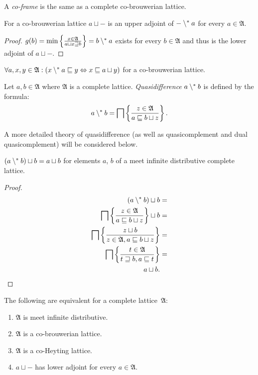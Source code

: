 \begin{defn}
A \emph{co-frame} is the same as a complete co-brouwerian lattice.\end{defn}
\begin{thm}
\label{cobrow-adj}For a co-brouwerian lattice $a\sqcup\mathord-$
is an upper adjoint of $\mathord-\setminus^{\ast} a$ for every $a\in\mathfrak{A}$.\end{thm}
\begin{proof}
$g(b)=\min\left\{ \frac{x\in\mathfrak{A}}{a\sqcup x\sqsupseteq b}\right\}=b\setminus^{\ast} a$
exists for every $b\in\mathfrak{A}$ and thus is the lower adjoint
of $a\sqcup\mathord-$.\end{proof}
\begin{cor}
\label{adjoint-brow-full}$\forall a,x,y\in\mathfrak{A}:(x\setminus^{\ast} a\sqsubseteq y\Leftrightarrow x\sqsubseteq a\sqcup y)$
for a co-brouwerian lattice.\end{cor}
\begin{defn}
Let $a,b\in\mathfrak{A}$ where $\mathfrak{A}$
is a complete lattice. \emph{Quasidifference} $a\setminus^{\ast} b$ is
defined by the formula:
\[
a\setminus^{\ast} b=\bigsqcap\left\{ \frac{z\in\mathfrak{A}}{a\sqsubseteq b\sqcup z}\right\}.
\]
\end{defn}
\begin{rem}
A more detailed theory of quasidifference (as well as quasicomplement
and dual quasicomplement) will be considered below.\end{rem}
\begin{lem}
$(a\setminus^{\ast} b)\sqcup b=a\sqcup b$ for elements $a$, $b$ of a
meet infinite distributive complete lattice.\end{lem}
\begin{proof}
~
\begin{align*}
(a\setminus^{\ast} b)\sqcup b & =\\
\bigsqcap\left\{ \frac{z\in\mathfrak{A}}{a\sqsubseteq b\sqcup z}\right\}\sqcup b & =\\
\bigsqcap\left\{ \frac{z\sqcup b}{z\in\mathfrak{A},a\sqsubseteq b\sqcup z}\right\} & =\\
\bigsqcap\left\{ \frac{t\in\mathfrak{A}}{t\sqsupseteq b,a\sqsubseteq t}\right\} & =\\
a\sqcup b.
\end{align*}
\end{proof}
\begin{thm}
\label{brow-crit}The following are equivalent for a complete lattice~$\mathfrak{A}$:
\begin{enumerate}
\item \label{cobrow-cnd-dist}$\mathfrak{A}$ is meet infinite distributive.
\item \label{cobrow-cnd-cobrow}$\mathfrak{A}$ is a co-brouwerian lattice.
\item \label{cobrow-cnd-cohey}$\mathfrak{A}$ is a co-Heyting lattice.
\item \label{cobrow-cnd-adj}$a\sqcup\mathord-$ has lower adjoint for every
$a\in\mathfrak{A}$.
\end{enumerate}
\end{thm}

